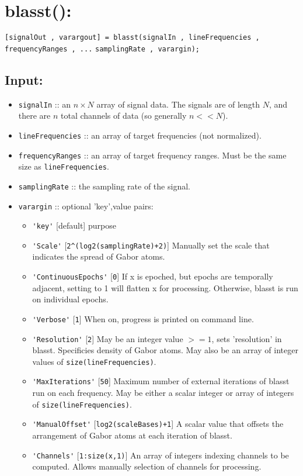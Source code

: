 \documentclass[11pt]{article}
\theoremstyle{remark}
\begin{document}
\section{blasst():}
\verb![signalOut , varargout] = blasst(signalIn , lineFrequencies , frequencyRanges , ...! \verb!samplingRate , varargin);!

\subsection{Input:}
\begin{itemize}
\item \verb!signalIn! :: an $n\times N$ array of signal data. The signals are of length $N$, and there are $n$ total channels of data (so generally $n << N$).

\item \verb!lineFrequencies! :: an array of target frequencies (not normalized).

\item \verb!frequencyRanges! :: an array of target frequency ranges. Must be the same size as \verb!lineFrequencies!.

\item \verb!samplingRate! :: the sampling rate of the signal.

\item \verb!varargin! :: optional 'key',value pairs:

\begin{itemize}

\item  \verb~'key'~          
          [default] purpose
\item   \verb~'Scale'~        
           [\verb~2^(log2(samplingRate)+2)~] Manually set the scale that 
           indicates the spread of Gabor atoms.
\item  \verb~'ContinuousEpochs'~  
           [\verb~0~] If x is epoched, but epochs are temporally adjacent, 
          setting to 1 will flatten x for processing. Otherwise, 
           blasst is run on individual epochs.
\item   \verb~'Verbose'~
           [\verb~1~] When on, progress is printed on command line.
\item   \verb~'Resolution'~
           [\verb~2~] May be an integer value $>= 1$, sets 'resolution' in blasst.
           Specificies density of Gabor atoms. May also be an array of
           integer values of \verb~size(lineFrequencies)~.
\item   \verb~'MaxIterations'~
           [\verb~50~] Maximum number of external iterations of blasst run on
           each frequency. May be either a scalar integer or array of
           integers of \verb~size(lineFrequencies)~.
\item   \verb~'ManualOffset'~
           [\verb~log2(scaleBases)+1~] A scalar value that offsets the 
           arrangement of Gabor atoms at each iteration of blasst.
\item   \verb~'Channels'~
           [\verb~1:size(x,1)~] An array of integers indexing channels to
           be computed. Allows manually selection of channels for
           processing.


\end{itemize}
\end{itemize}
\end{document}
